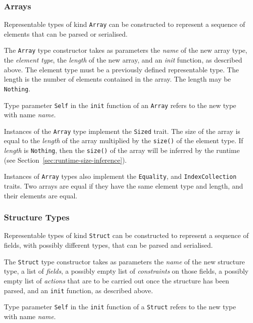 \documentclass[10pt,twocolumn,a4paper]{article}
\newcommand{\code}[1]{\texttt{#1}}
\begin{document}
\subsubsection{Arrays}

Representable types of kind \code{Array} can be constructed to represent
a sequence of elements that can be parsed or serialised.

The \code{Array} type constructor takes as parameters the \emph{name} of
the new array type, the \emph{element type}, the \emph{length} of the
new array, and an \emph{init} function, as described above.
The element type must be a previously defined representable type.
The length is the number of elements contained in the array.
The length may be \code{Nothing}.

Type parameter \code{Self} in the \code{init} function of an \code{Array} refers
to the new type with name \emph{name}.

Instances of the \code{Array} type implement the \code{Sized} trait. The size of
the array is equal to the \emph{length} of the array multiplied by the
\code{size()} of the element type. If \emph{length} is \code{Nothing}, then the
\code{size()} of the array will be inferred by the runtime (see
Section~\ref{sec:runtime-size-inference}).

Instances of \code{Array} types also implement the \code{Equality},
and \code{IndexCollection} traits.
Two arrays are equal if they have the same element type and length, and
their elements are equal.

\subsubsection{Structure Types}

Representable types of kind \code{Struct} can be constructed to represent
a sequence of fields, with possibly different types, that can be parsed
and serialised.

The \code{Struct} type constructor takes as parameters the \emph{name} of
the new structure type, a list of \emph{fields}, a possibly empty list of
\emph{constraints} on those fields, a possibly empty list of
\emph{actions} that are to be carried out once the structure has been
parsed, and an \code{init} function, as described above.

Type parameter \code{Self} in the \code{init} function of a \code{Struct} refers
to the new type with name \emph{name}.
\end{document}
